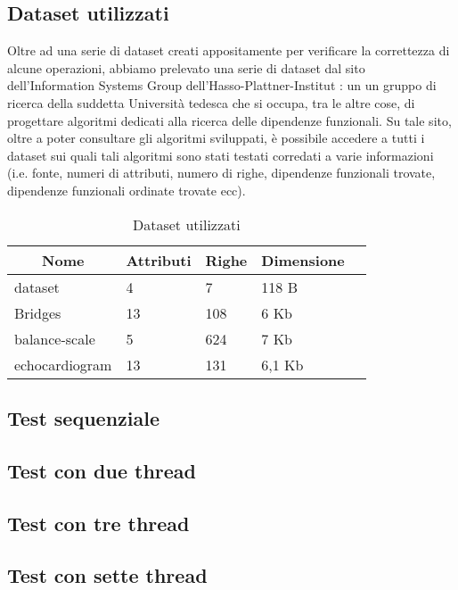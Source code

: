 \subsection{Dataset utilizzati}
Oltre ad una serie di dataset creati appositamente per verificare la correttezza di alcune operazioni, abbiamo prelevato una serie di dataset dal sito dell'Information Systems Group dell'Hasso-Plattner-Institut \cite{metanome}: un un gruppo di ricerca della suddetta Università tedesca che si occupa, tra le altre cose, di progettare algoritmi dedicati alla ricerca delle dipendenze funzionali. Su tale sito, oltre a poter consultare gli algoritmi sviluppati, è possibile accedere a tutti i dataset sui quali tali algoritmi sono stati testati corredati a varie informazioni (i.e. fonte, numeri di attributi, numero di righe, dipendenze funzionali trovate, dipendenze funzionali ordinate trovate ecc).\\
\begin{table}[h]
	\centering
	\begin{tabular}{lllll}
		\multicolumn{1}{c}{\textbf{Nome}} & \multicolumn{1}{c}{\textbf{Attributi}} & \multicolumn{1}{c}{\textbf{Righe}} & \multicolumn{1}{c}{\textbf{Dimensione}} \\
		\hline
		dataset & 4 & 7 & 118 B \\
		Bridges & 13  & 108 & 6 Kb\\
		balance-scale  & 5  & 624 & 7 Kb\\
		echocardiogram  & 13  & 131 & 6,1 Kb\\
	\end{tabular}
	\caption{Dataset utilizzati}
	\label{datasetUtilizzati}
\end{table}
\subsection{Test sequenziale}
\subsection{Test con due thread}
\subsection{Test con tre thread}
\subsection{Test con sette thread}